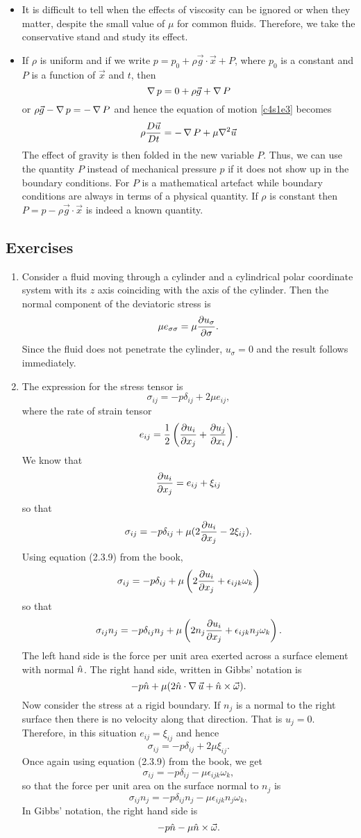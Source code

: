 \begin{itemize}
\item It is difficult to tell when the effects of viscosity can be ignored or when they matter, despite the small value of $\mu$ for common fluids. Therefore, we take the conservative stand
and study its effect.

\item If $\rho$ is uniform and if we write $p = p_0 + \rho\vec{g}\cdot\vec{x} + P$, where $p_0$ is a constant and $P$ is a function of $\vec{x}$ and $t$, then
\[
\operatorname{\nabla} p = 0 + \rho\vec{g} + \operatorname{\nabla}{P}
\]
or $\rho\vec{g} - \operatorname{\nabla}{p} = -\operatorname{\nabla}{P}$ and hence the equation of motion \eqref{c4s1e3} becomes 
\[
\rho\frac{D{\vec{u}}}{Dt} = -\operatorname{\nabla} P + \mu\nabla^2\vec{u}
\]
The effect of gravity is then folded in the new variable $P$. Thus, we can use the quantity $P$ instead of mechanical pressure $p$ if it does not show up in the boundary conditions. For $P$
is a mathematical artefact while boundary conditions are always in terms of a physical quantity. If $\rho$ is constant then $P = p - \rho\vec{g}\cdot\vec{x}$ is indeed a known quantity.
\end{itemize}
\subsection{Exercises}
\begin{enumerate}
\item Consider a fluid moving through a cylinder and a cylindrical polar coordinate system with its $z$ axis 
coinciding with the axis of the cylinder. Then the normal component of the deviatoric stress is
\[
\mu e_{\sigma\sigma} = \mu\frac{\partial{u_\sigma}}{\partial{\sigma}}.
\]
Since the fluid does not penetrate the cylinder, $u_\sigma = 0$ and the result follows immediately.

\item The expression for the stress tensor is
\[
\sigma_{ij} = -p\delta_{ij} + 2\mu e_{ij},
\]
where the rate of strain tensor 
\[
e_{ij} = \frac{1}{2}\left(\frac{\partial{u_i}}{\partial{x_j}} + \frac{\partial{u_j}}{\partial{x_i}}\right).
\]
We know that
\[
\frac{\partial{u_i}}{\partial{x_j}} = e_{ij} + \xi_{ij}
\]
so that
\[
\sigma_{ij} = -p\delta_{ij} + \mu(2\frac{\partial{u_i}}{\partial{x_j}} - 2\xi_{ij}).
\]
Using equation (2.3.9) from the book, 
\[
\sigma_{ij} = -p\delta_{ij} + \mu\left(2\frac{\partial{u_i}}{\partial{x_j}} + \epsilon_{ijk}\omega_k\right)
\]
so that
\[
\sigma_{ij}n_j = -p\delta_{ij}n_j + \mu\left(2n_j\frac{\partial{u_i}}{\partial{x_j}} + \epsilon_{ijk}n_j\omega_k\right).
\]
The left hand side is the force per unit area exerted across a surface element with normal $\hat{n}$. The right
hand side, written in Gibbs' notation is
\[
-p\hat{n} + \mu(2\hat{n}\cdot\operatorname{\nabla}\vec{u} + \hat{n} \times \vec{\omega}).
\]
Now consider the stress at a rigid boundary. If $n_j$ is a normal to the right surface then there is no velocity
along that direction. That is $u_j = 0$. Therefore, in this situation $e_{ij} = \xi_{ij}$ and hence
\[
\sigma_{ij} = -p\delta_{ij} + 2\mu \xi_{ij}.
\]
Once again using equation (2.3.9) from the book, we get
\[
\sigma_{ij} = -p\delta_{ij} - \mu \epsilon_{ijk}\omega_k,
\]
so that the force per unit area on the surface normal to $n_j$ is
\[
\sigma_{ij}n_j = -p\delta_{ij}n_j - \mu \epsilon_{ijk}n_j\omega_k,
\]
In Gibbs' notation, the right hand side is
\[
-p\hat{n} - \mu\hat{n}\times\vec{\omega}.
\]
\end{enumerate}


